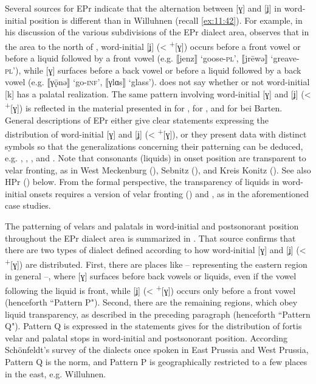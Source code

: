 Several sources for EPr indicate that the alternation between [ɣ] and [ʝ] in word-initial position is different than in Willuhnen (recall \ref{ex:11:42}). For example, in his discussion of the various subdivisions of the EPr dialect area, \citet{Ziesemer1924} observes that in the area to the north of , word-initial [ʝ] (<  \textsuperscript{+}[ɣ]) occurs before a front vowel or before a liquid followed by a front vowel (e.g. ⟦jenz⟧ ‘goose-\textsc{pl}’, ⟦jrēwə⟧ ‘greave-\textsc{pl}’), while [ɣ] surfaces before a back vowel or before a liquid followed by a back vowel (e.g. ⟦γǭnə⟧ ‘go-\textsc{inf}’, ⟦γlɑs⟧ ‘glass’). \citet{Ziesemer1924} does not say whether or not word-initial [k] has a palatal realization. The same pattern involving  word-initial [ɣ] and [ʝ] (<  \textsuperscript{+}[ɣ]) is reflected in the material presented in \citet{Wagner1912} for , \citet{Mitzka1919} for , and \citet{Tessmann1966} for  bei Barten. General descriptions of EPr either give clear statements expressing the distribution of word-initial [ɣ] and [ʝ] (<  \textsuperscript{+}[ɣ]), or they present data with distinct symbols so that the generalizations concerning their patterning can be deduced, e.g. \citet{Förstemann1850}, \citet{Fischer1896}, \citet{Kantel1900}, and \citet{Betcke1924}. Note that consonants (liquids) in onset position are transparent to velar fronting, as in West Meckenburg (), Sebnitz (), and Kreis Konitz (). See also HPr () below. From the formal perspective, the transparency of liquids in word-initial onsets requires a version of velar fronting () and , as in the aforementioned case studies.

The patterning of velars and palatals in word-initial and postsonorant position throughout the EPr dialect area is summarized in \citet[84--87]{Schönfeldt1977}. That source confirms that there are two types of dialect defined according to how word-initial [ɣ] and [ʝ] (< \textsuperscript{+}[ɣ]) are distributed. First, there are places like  -- representing the eastern region in general --, where [ɣ] surfaces before back vowels or liquids, even if the vowel following the liquid is front, while [ʝ] (< \textsuperscript{+}[ɣ]) occurs only before a front vowel (henceforth “Pattern P"). Second, there are the remaining regions, which obey liquid transparency, as described in the preceding paragraph (henceforth “Pattern Q"). Pattern Q is expressed in the statements \citet[84]{Schönfeldt1977} gives for the distribution of fortis velar and palatal stops in word-initial and postsonorant position. According Schönfeldt's survey of the dialects once spoken in East Prussia and West Prussia, Pattern Q is the norm, and Pattern P is geographically restricted to a few places in the east, e.g. Willuhnen.

